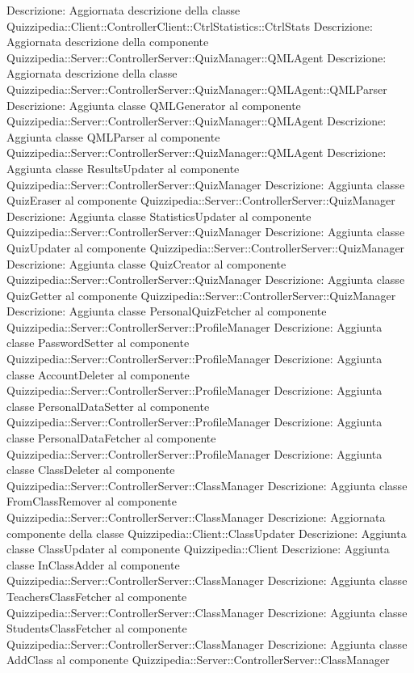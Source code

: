 Descrizione: Aggiornata descrizione della classe Quizzipedia::Client::ControllerClient::CtrlStatistics::CtrlStats 
Descrizione: Aggiornata descrizione della componente Quizzipedia::Server::ControllerServer::QuizManager::QMLAgent 
Descrizione: Aggiornata descrizione della classe Quizzipedia::Server::ControllerServer::QuizManager::QMLAgent::QMLParser 
Descrizione: Aggiunta classe QMLGenerator al componente Quizzipedia::Server::ControllerServer::QuizManager::QMLAgent 
Descrizione: Aggiunta classe QMLParser al componente Quizzipedia::Server::ControllerServer::QuizManager::QMLAgent 
Descrizione: Aggiunta classe ResultsUpdater al componente Quizzipedia::Server::ControllerServer::QuizManager 
Descrizione: Aggiunta classe QuizEraser al componente Quizzipedia::Server::ControllerServer::QuizManager 
Descrizione: Aggiunta classe StatisticsUpdater al componente Quizzipedia::Server::ControllerServer::QuizManager 
Descrizione: Aggiunta classe QuizUpdater al componente Quizzipedia::Server::ControllerServer::QuizManager 
Descrizione: Aggiunta classe QuizCreator al componente Quizzipedia::Server::ControllerServer::QuizManager 
Descrizione: Aggiunta classe QuizGetter al componente Quizzipedia::Server::ControllerServer::QuizManager 
Descrizione: Aggiunta classe PersonalQuizFetcher al componente Quizzipedia::Server::ControllerServer::ProfileManager 
Descrizione: Aggiunta classe PasswordSetter al componente Quizzipedia::Server::ControllerServer::ProfileManager 
Descrizione: Aggiunta classe AccountDeleter al componente Quizzipedia::Server::ControllerServer::ProfileManager 
Descrizione: Aggiunta classe PersonalDataSetter al componente Quizzipedia::Server::ControllerServer::ProfileManager 
Descrizione: Aggiunta classe PersonalDataFetcher al componente Quizzipedia::Server::ControllerServer::ProfileManager 
Descrizione: Aggiunta classe ClassDeleter al componente Quizzipedia::Server::ControllerServer::ClassManager 
Descrizione: Aggiunta classe FromClassRemover al componente Quizzipedia::Server::ControllerServer::ClassManager 
Descrizione: Aggiornata componente della classe Quizzipedia::Client::ClassUpdater 
Descrizione: Aggiunta classe ClassUpdater al componente Quizzipedia::Client 
Descrizione: Aggiunta classe InClassAdder al componente Quizzipedia::Server::ControllerServer::ClassManager 
Descrizione: Aggiunta classe TeachersClassFetcher al componente Quizzipedia::Server::ControllerServer::ClassManager 
Descrizione: Aggiunta classe StudentsClassFetcher al componente Quizzipedia::Server::ControllerServer::ClassManager 
Descrizione: Aggiunta classe AddClass al componente Quizzipedia::Server::ControllerServer::ClassManager 
